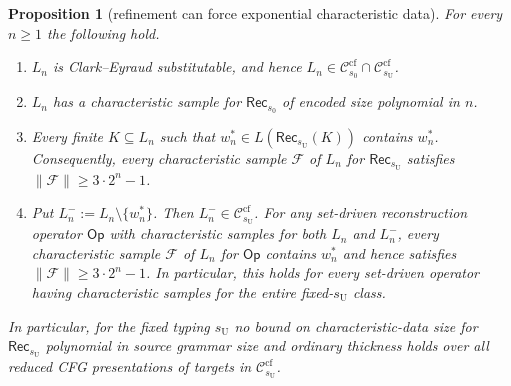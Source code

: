 \documentclass[11pt,a4paper]{article}
\newtheorem{proposition}[theorem]{Proposition}
\theoremstyle{remark}
\theoremstyle{plain}
\newcommand{\cf}{\mathrm{cf}}
\newcommand{\Ccf}[1]{\mathcal C_{#1}^{\cf}}
\begin{document}
\begin{proposition}[refinement can force exponential characteristic data]
\label{prop:typed-thickness-gap}
For every $n\ge1$ the following hold.
\begin{enumerate}[label=\textup{(\roman*)},nosep]
\item $L_n$ is Clark--Eyraud substitutable, and hence
$L_n\in\Ccf{s_0}\cap\Ccf{s_{\mathrm U}}$.
\item $L_n$ has a characteristic sample for $\mathsf{Rec}_{s_0}$
of encoded size polynomial in $n$.
\item Every finite $K\subseteq L_n$ such that
$w^*_n\in L(\mathsf{Rec}_{s_{\mathrm U}}(K))$ contains $w^*_n$.
Consequently, every characteristic sample $\mathcal F$ of $L_n$ for
$\mathsf{Rec}_{s_{\mathrm U}}$ satisfies
$\|\mathcal F\|\ge 3\cdot 2^n-1$.
\item Put $L^-_n:=L_n\setminus\{w_n^*\}$. Then
$L^-_n\in\Ccf{s_{\mathrm U}}$. For any set-driven reconstruction
operator $\mathsf{Op}$ with characteristic samples for both $L_n$
and $L^-_n$, every characteristic sample $\mathcal F$ of $L_n$ for
$\mathsf{Op}$ contains $w_n^*$ and hence satisfies
$\|\mathcal F\|\ge3\cdot2^n-1$. In particular, this holds for every
set-driven operator having characteristic samples for the entire
fixed-$s_{\mathrm U}$ class.
\end{enumerate}
In particular, for the fixed typing $s_{\mathrm U}$ no bound on
characteristic-data size for $\mathsf{Rec}_{s_{\mathrm U}}$
polynomial in source grammar size and ordinary thickness holds over
all reduced CFG presentations of targets in $\Ccf{s_{\mathrm U}}$.
\end{proposition}
\end{document}
